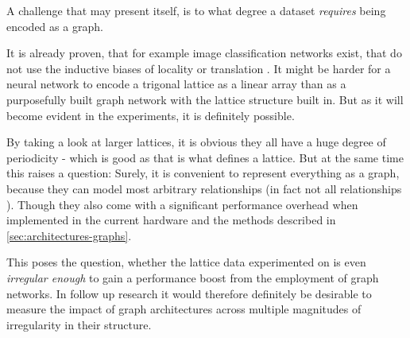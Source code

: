 A challenge that may present itself, is to what degree a dataset \emph{requires} being encoded as a graph.

It is already proven, that for example image classification networks exist, that do not use the inductive biases of locality or translation \cite{imageWorth16x16}. 
It might be harder for a neural network to encode a trigonal lattice as a linear array than as a purposefully built graph network with the lattice structure built in.
But as it will become evident in the experiments, it is definitely possible. 

By taking a look at larger lattices, it is obvious they all have a huge degree of periodicity - which is good as that is what defines a lattice.
But at the same time this raises a question: Surely, it is convenient to represent everything as a graph, because they can model most arbitrary relationships (in fact not all relationships \cite{relationalInductiveBiasesAndGraphNetworks}). 
Though they also come with a significant performance overhead when implemented in the current hardware and the methods described in \autoref{sec:architectures-graphs}. 

This poses the question, whether the lattice data experimented on is even \emph{irregular enough} to gain a performance boost from the employment of graph networks.
In follow up research it would therefore definitely be desirable to measure the impact of graph architectures across multiple magnitudes of \glqq irregularity\grqq{} in their structure.
